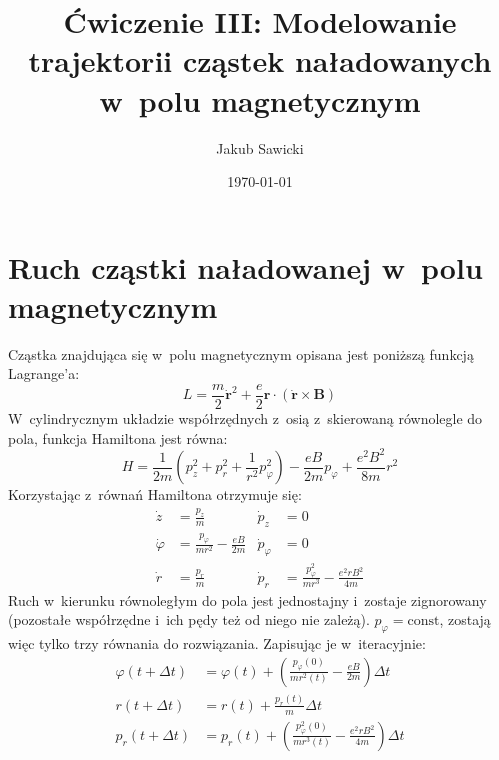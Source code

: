 \documentclass[a4paper; 12pt]{article}
\title{Ćwiczenie III: Modelowanie trajektorii cząstek naładowanych w~polu magnetycznym}
\author{Jakub Sawicki}
\date{\today}
\begin{document}
\renewcommand{\figurename}{Rys.}
\renewcommand{\tablename}{Tab.}
\renewcommand{\abstractname}{Abstrakt}

\maketitle

\section{Ruch cząstki naładowanej w~polu magnetycznym}

Cząstka znajdująca się w~polu magnetycznym opisana jest poniższą funkcją Lagrange'a:
\begin{equation}
    L = \frac{m}{2}\dot{\mathbf{r}}^2+\frac{e}{2}\mathbf{r}\cdot\left( \dot{\mathbf{r}} \times \mathbf{B} \right)
    \label{eq:L}
\end{equation}
W~cylindrycznym układzie współrzędnych z~osią z~skierowaną równolegle do pola, funkcja Hamiltona jest równa:
\begin{equation}
    H=\frac{1}{2m}\left(p_z^2+p_r^2+\frac{1}{r^2}p_\varphi^2\right)-\frac{eB}{2m}p_\varphi+\frac{e^2B^2}{8m}r^2
    \label{eq:H}
\end{equation}
Korzystając z~równań Hamiltona otrzymuje się:
\begin{subequations}
\begin{align}
    \dot{z}&=\frac{p_z}{m}&\dot{p}_z&=0 \\
    \dot{\varphi}&=\frac{p_\varphi}{mr^2}-\frac{eB}{2m}&\dot{p}_\varphi&=0 \\
    \dot{r}&=\frac{p_r}{m}&\dot{p}_r&=\frac{p_\varphi^2}{mr^3}-\frac{e^2rB^2}{4m}
\end{align}
\end{subequations}
Ruch w~kierunku równoległym do pola jest jednostajny i~zostaje zignorowany
(pozostałe współrzędne i~ich pędy też od niego nie zależą).
$p_\varphi=\text{const}$, zostają więc tylko trzy równania do rozwiązania.
Zapisując je w~iteracyjnie:
\begin{subequations}
\begin{align}
    \varphi(t+\Delta t)&=\varphi(t)+\left( \frac{p_\varphi(0)}{mr^2(t)}-\frac{eB}{2m} \right)\Delta t \\
    r(t+\Delta t)&=r(t)+\frac{p_r(t)}{m}\Delta t \\
    p_r(t+\Delta t)&=p_r(t)+\left( \frac{p_\varphi^2(0)}{mr^3(t)}-\frac{e^2rB^2}{4m} \right)\Delta t
\end{align}
\end{subequations}
\end{document}
